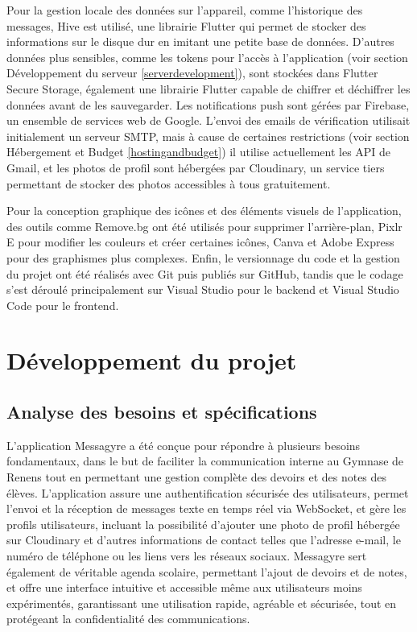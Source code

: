 \documentclass[12pt]{report}
\begin{document}
	Pour la gestion locale des données sur l'appareil, comme l'historique des messages, Hive\supercite{hive} est utilisé, une librairie Flutter qui permet de stocker des informations sur le disque dur en imitant une petite base de données. D'autres données plus sensibles, comme les tokens pour l'accès à l'application (voir section Développement du serveur \ref{serverdevelopment}), sont stockées dans Flutter Secure Storage, également une librairie Flutter capable de chiffrer et déchiffrer les données avant de les sauvegarder. Les notifications push sont gérées par Firebase\supercite{firebase}, un ensemble de services web de Google\supercite{google}. L'envoi des emails de vérification utilisait initialement un serveur SMTP\supercite{smtp}, mais à cause de certaines restrictions (voir section Hébergement et Budget \ref{hostingandbudget}) il utilise actuellement les API de Gmail\supercite{gmailapi}, et les photos de profil sont hébergées par Cloudinary\supercite{cloudinary}, un service tiers permettant de stocker des photos accessibles à tous gratuitement.
	
	Pour la conception graphique des icônes et des éléments visuels de l'application, des outils comme Remove.bg\supercite{removebg} ont été utilisés pour supprimer l'arrière-plan, Pixlr E\supercite{pixlre} pour modifier les couleurs et créer certaines icônes, Canva\supercite{canva} et Adobe Express\supercite{adobeexpress} pour des graphismes plus complexes. Enfin, le versionnage du code et la gestion du projet ont été réalisés avec Git\supercite{git} puis publiés sur GitHub\supercite{github}, tandis que le codage s'est déroulé principalement sur Visual Studio\supercite{visualstudio} pour le backend et Visual Studio Code\supercite{vscode} pour le frontend.
	
	
	\chapter{Développement du projet}
	
	\section{Analyse des besoins et spécifications}
	
	L’application Messagyre a été conçue pour répondre à plusieurs besoins fondamentaux, dans le but de faciliter la communication interne au Gymnase de Renens tout en permettant une gestion complète des devoirs et des notes des élèves. L’application assure une authentification sécurisée des utilisateurs, permet l’envoi et la réception de messages texte en temps réel via WebSocket\supercite{websocket}, et gère les profils utilisateurs, incluant la possibilité d’ajouter une photo de profil hébergée sur Cloudinary\supercite{cloudinary} et d’autres informations de contact telles que l’adresse e-mail, le numéro de téléphone ou les liens vers les réseaux sociaux. Messagyre sert également de véritable agenda scolaire, permettant l’ajout de devoirs et de notes, et offre une interface intuitive et accessible même aux utilisateurs moins expérimentés, garantissant une utilisation rapide, agréable et sécurisée, tout en protégeant la confidentialité des communications\supercite{https}.
	
\end{document}
